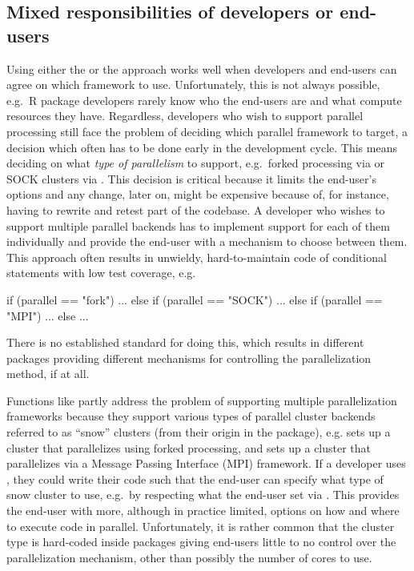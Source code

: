 \subsection{Mixed responsibilities of developers or end-users}
\label{mixed-responsibilities}

Using either the  or the  approach
works well when developers and end-users can agree on which framework
to use. Unfortunately, this is not always possible, e.g.\ R package
developers rarely know who the end-users are and what compute
resources they have. Regardless, developers who wish to support
parallel processing still face the problem of deciding which parallel
framework to target, a decision which often has to be done early in
the development cycle. This means deciding on what \emph{type of
parallelism} to support, e.g.\ forked processing via 
or SOCK clusters via . This decision is critical
because it limits the end-user's options and any change, later on,
might be expensive because of, for instance, having to rewrite and
retest part of the codebase. A developer who wishes to support
multiple parallel backends has to implement support for each of them
individually and provide the end-user with a mechanism to choose
between them. This approach often results in unwieldy,
hard-to-maintain code of conditional statements with low test
coverage, e.g.
\begin{example}
if (parallel == "fork") {
  ...
} else if (parallel == "SOCK") {
  ...
} else if (parallel == "MPI") {
  ...
} else {
  ...
}
\end{example}
There is no established standard for doing this, which results in
different packages providing different mechanisms for controlling the
parallelization method, if at all.

Functions like  partly address the problem of
supporting multiple parallelization frameworks because they support
various types of parallel cluster backends referred to as ``snow''
clusters (from their origin in the  package), e.g.
 sets up a cluster that
parallelizes using forked processing, and
 sets up a cluster that
parallelizes via a Message Passing Interface (MPI) framework.  If a
developer uses , they could write their code such
that the end-user can specify what type of snow cluster to use, e.g.\
by respecting what the end-user set
via .  This provides the end-user
with more, although in practice limited, options on how and where to
execute code in parallel. Unfortunately, it is rather common that the
cluster type is hard-coded inside packages giving end-users little to
no control over the parallelization mechanism, other than possibly the
number of cores to use.

